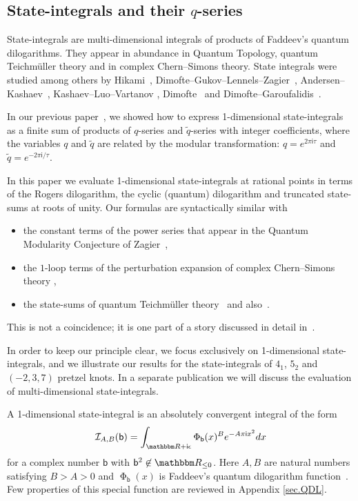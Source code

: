 \documentclass[12pt]{amsart}
\theoremstyle{definition}
\def\BR{\mathbbm R}
\def\calI{\mathcal I}
\def\tq{\tilde{q}}
\newcommand{\im}{\mathsf{i}}
\newcommand{\fad}[1]{\operatorname{\Phi}_{#1}}
\begin{document}
\subsection{State-integrals and their $q$-series}
\label{sub.intro}

State-integrals are multi-dimensional integrals of products of 
Faddeev's quantum dilogarithms. They appear in abundance in Quantum Topology,
quantum Teichm\"uller theory and in complex Chern--Simons theory. State
integrals were studied among others by 
Hikami~\cite{Hi}, Dimofte--Gukov--Lennels--Zagier~\cite{DGLZ}, 
Andersen--Kashaev~\cite{AK,AK:complex}, Kashaev--Luo--Vartanov \cite{KLV},
Dimofte~\cite{Dimofte:complex} and Dimofte--Garoufalidis~\cite{DG2}. 

In our previous paper~\cite{state-integrals}, we showed how to express 
1-dimensional state-integrals as a finite sum of products of $q$-series and 
$\tq$-series with integer coefficients, where the variables $q$ and $\tq$ are 
related by the modular transformation: $q=e^{2\pi\im\tau}$ and 
$\tq=e^{-2\pi\im/\tau}$.

In this paper we evaluate 1-dimensional state-integrals at rational points 
in terms of the Rogers dilogarithm, the cyclic (quantum) dilogarithm and 
truncated state-sums at roots of unity. Our formulas are syntactically 
similar with 
\begin{itemize}
\item[(a)]
the constant terms of the power series that appear in 
the Quantum Modularity Conjecture of Zagier~\cite{Za:QMF,GZ1},
\item[(b)]
the $1$-loop terms of the perturbation expansion of complex Chern--Simons
theory \cite{DG2},
\item[(c)]
the state-sums of quantum Teichm\"uller theory~\cite{Kashaev:6j,K95,K97} and 
also~\cite[Sec.6]{BB}.
\end{itemize} 
This is not a coincidence; it is one part of a story discussed
in detail in~\cite{GZ2}.

In order to keep our 
principle clear, we focus exclusively on 1-dimensional state-integrals, and we illustrate our results for the state-integrals of
$4_1$, $5_2$ and $(-2,3,7)$ pretzel knots. In a separate publication we will
discuss the evaluation of multi-dimensional state-integrals.

A 1-dimensional state-integral is an absolutely convergent integral of 
the form
\begin{equation}
\label{eq.IAB}
\calI_{A,B}(\mathsf{b})=
\int_{\BR + \im \epsilon} \fad{\mathsf{b}}(x)^B e^{-A \pi \im x^2} dx
\end{equation}
for a complex number $\mathsf{b}$ with $\mathsf{b}^2 \not\in \BR_{\leq 0}$. 
Here $A, B$ are natural
numbers satisfying $B > A > 0$ and $\fad{\mathsf{b}}(x)$ is Faddeev's quantum 
dilogarithm function~\cite{Faddeev,FK-QDL}. Few properties of this special
function are reviewed in Appendix \ref{sec.QDL}.
\end{document}
